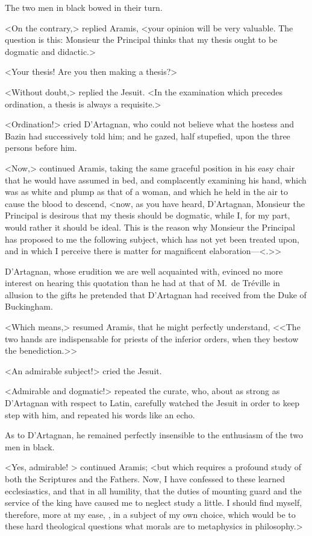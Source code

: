 The two men in black bowed in their turn. 

<On the contrary,> replied Aramis, <your opinion will be very valuable. The question is this: Monsieur the Principal thinks that my thesis ought to be dogmatic and didactic.> 

<Your thesis! Are you then making a thesis?> 

<Without doubt,> replied the Jesuit. <In the examination which precedes ordination, a thesis is always a requisite.> 

<Ordination!> cried D'Artagnan, who could not believe what the hostess and Bazin had successively told him; and he gazed, half stupefied, upon the three persons before him. 

<Now,> continued Aramis, taking the same graceful position in his easy chair that he would have assumed in bed, and complacently examining his hand, which was as white and plump as that of a woman, and which he held in the air to cause the blood to descend, <now, as you have heard, D'Artagnan, Monsieur the Principal is desirous that my thesis should be dogmatic, while I, for my part, would rather it should be ideal. This is the reason why Monsieur the Principal has proposed to me the following subject, which has not yet been treated upon, and in which I perceive there is matter for magnificent elaboration—<.>> 

D'Artagnan, whose erudition we are well acquainted with, evinced no more interest on hearing this quotation than he had at that of M.~de Tréville in allusion to the gifts he pretended that D'Artagnan had received from the Duke of Buckingham. 

<Which means,> resumed Aramis, that he might perfectly understand, <<The two hands are indispensable for priests of the inferior orders, when they bestow the benediction.>> 

<An admirable subject!> cried the Jesuit. 

<Admirable and dogmatic!> repeated the curate, who, about as strong as D'Artagnan with respect to Latin, carefully watched the Jesuit in order to keep step with him, and repeated his words like an echo. 

As to D'Artagnan, he remained perfectly insensible to the enthusiasm of the two men in black. 

<Yes, admirable! > continued Aramis; <but which requires a profound study of both the Scriptures and the Fathers. Now, I have confessed to these learned ecclesiastics, and that in all humility, that the duties of mounting guard and the service of the king have caused me to neglect study a little. I should find myself, therefore, more at my ease, , in a subject of my own choice, which would be to these hard theological questions what morals are to metaphysics in philosophy.> 

